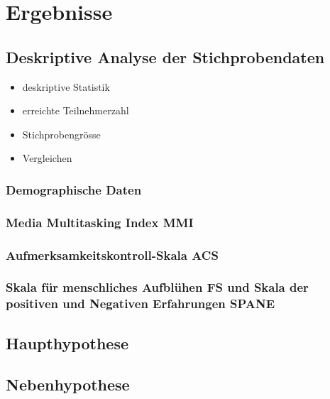 %
%
\let\raggedsection\centering 
\chapter{Ergebnisse}
\let\raggedsection\raggedright 
\glsresetall

\section{Deskriptive Analyse der Stichprobendaten}
\label{label.stichprobe}
\begin{itemize}
      \item deskriptive Statistik
      \item erreichte Teilnehmerzahl
      \item Stichprobengrösse
      \item Vergleichen 
\end{itemize}
\subsection{Demographische Daten}
\subsection{Media Multitasking Index MMI}
\subsection{Aufmerksamkeitskontroll-Skala ACS}
\subsection{Skala für menschliches Aufblühen FS und Skala der positiven und Negativen Erfahrungen SPANE}


\section{Haupthypothese}\label{label.haupthypothese}
\section{Nebenhypothese}\label{label.nebenhypothese}



